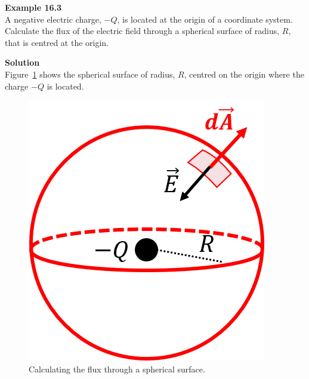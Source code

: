 \begin{framed}
\textbf{Example 16.3}\\
A negative electric charge, $-Q$, is located at the origin of a coordinate system. Calculate the flux of the electric field through a spherical surface of radius, $R$, that is centred at the origin.

\begin{framed}
\textbf{Solution}\\
Figure~\ref{fig:gauss:fluxsphere} shows the spherical surface of radius, $R$, centred on the origin where the charge $-Q$ is located.

\begin{figure}[!htbp]
\centering
\includegraphics[width=0.3\linewidth]{files/fluxsphere-ae8a21173bcf1a55fdaa3f4d3992daec.png}
\caption[]{Calculating the flux through a spherical surface.}
\label{fig:gauss:fluxsphere}
\end{figure}


\end{framed}
\end{framed}
